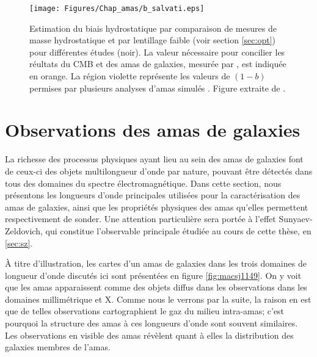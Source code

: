 \begin{figure}
    \centering
    \texttt{[image: Figures/Chap\_amas/b\_salvati.eps]}
    \hspace{15pt}
    \caption{
        Estimation du biais hydrostatique par comparaison de mesures de masse hydrostatique et par lentillage faible (voir section \ref{sec:opt}) pour différentes études (noir).
        La valeur nécessaire pour concilier les réultats du CMB et des amas de galaxies, mesurée par \cite{salvati_constraints_2018}, est indiquée en orange.
        La région violette représente les valeurs de $(1-b)$ permises par plusieurs analyses d'amas simulés \cite{planck_collaboration_planck_2013}.
        Figure extraite de \cite{salvati_constraints_2018}.
    }
    \label{fig:hse_bias}
\end{figure}

\section{Observations des amas de galaxies} \label{sec:cluster_obs}

La richesse des processus physiques ayant lieu au sein des amas de galaxies font de ceux-ci des objets multilongueur d'onde par nature, pouvant être détectés dans tous des domaines du spectre électromagnétique.
Dans cette section, nous présentons les longueurs d'onde principales utilisées pour la caractérisation des amas de galaxies, ainsi que les propriétés physiques des amas qu'elles permettent respectivement de sonder.
Une attention particulière sera portée à l'effet Sunyaev-Zeldovich, qui constitue l'observable principale étudiée au cours de cette thèse, en \ref{sec:sz}.

À titre d'illustration, les cartes d'un amas de galaxies dans les trois domaines de longueur d'onde discutés ici sont présentées en figure \ref{fig:macsj1149}.
On y voit que les amas apparaissent comme des objets diffus dans les observations dans les domaines millimétrique et X.
Comme nous le verrons par la suite, la raison en est que de telles observations cartographient le gaz du milieu intra-amas; c'est pourquoi la structure des amas à ces longueurs d'onde sont souvent similaires.
Les observations en visible des amas révèlent quant à elles la distribution des galaxies membres de l'amas.

